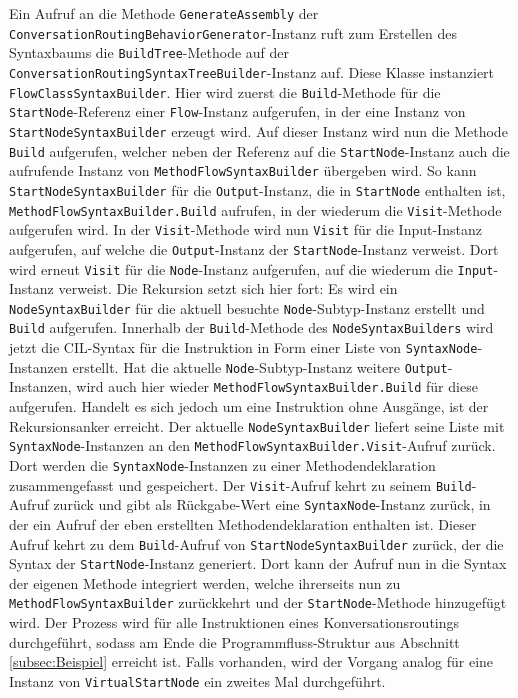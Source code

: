 \noindent Ein Aufruf an die Methode \texttt{GenerateAssembly} der \texttt{Con\-ver\-sa\-tion\-Rou\-ting\-Be\-ha\-vior\-Gen\-era\-tor}-Instanz ruft zum Erstellen des Syntaxbaums die \texttt{Build\-Tree}-Methode auf der \texttt{Con\-ver\-sa\-tion\-Rou\-ting\-Syn\-tax\-Tree\-Buil\-der}-Instanz auf. Diese Klasse instanziert \texttt{Flow\-Class\-Syn\-tax\-Buil\-der}. Hier wird zuerst die \texttt{Build}-Methode für die \texttt{StartNode}-Referenz einer \texttt{Flow}-Instanz aufgerufen, in der eine Instanz von \texttt{StartNodeSyntaxBuilder} erzeugt wird. Auf dieser Instanz wird nun die Methode \texttt{Build} aufgerufen, welcher neben der Referenz auf die \texttt{StartNode}-Instanz auch die aufrufende Instanz von \texttt{Meth\-od\-Flow\-Syn\-tax\-Buil\-der} übergeben wird. So kann \texttt{StartNodeSyntaxBuilder} für die \texttt{Output}-Instanz, die in \texttt{StartNode} enthalten ist, \texttt{MethodFlowSyntaxBuilder.Build} aufrufen, in der wiederum die \texttt{Visit}-Methode aufgerufen wird. In der \texttt{Visit}-Methode wird nun \texttt{Visit} für die Input-Instanz aufgerufen, auf welche die \texttt{Output}-Instanz der \texttt{Start\-Node}-Instanz verweist. Dort wird erneut \texttt{Visit} für die \texttt{Node}-Instanz aufgerufen, auf die wiederum die \texttt{Input}-Instanz verweist. Die Rekursion setzt sich hier fort: Es wird ein \texttt{NodeSyntaxBuilder} für die aktuell besuchte \texttt{Node}-Subtyp-Instanz erstellt und \texttt{Build} aufgerufen. Innerhalb der \texttt{Build}-Methode des \texttt{NodeSyntaxBuilders} wird jetzt die CIL-Syntax für die Instruktion in Form einer Liste von \texttt{SyntaxNode}-Instanzen erstellt. Hat die aktuelle \texttt{Node}-Subtyp-Instanz weitere \texttt{Output}-Instanzen, wird auch hier wieder \texttt{Meth\-od\-Flow\-Syn\-tax\-Buil\-der.Build} für diese aufgerufen. Handelt es sich jedoch um eine Instruktion ohne Ausgänge, ist der Rekursionsanker erreicht. Der aktuelle \texttt{NodeSyntaxBuilder} liefert seine Liste mit \texttt{SyntaxNode}-Instanzen an den \texttt{Meth\-od\-Flow\-Syn\-tax\-Buil\-der.Visit}-Aufruf zurück. Dort werden die \texttt{SyntaxNode}-Instanzen zu einer Methodendeklaration zusammengefasst und gespeichert. Der \texttt{Visit}-Aufruf kehrt zu seinem \texttt{Build}-Aufruf zurück und gibt als Rückgabe-Wert eine \texttt{SyntaxNode}-Instanz zurück, in der ein Aufruf der eben erstellten Methodendeklaration enthalten ist. Dieser Aufruf kehrt zu dem \texttt{Build}-Aufruf von \texttt{StartNodeSyntaxBuilder} zurück, der die Syntax der \texttt{StartNode}-Instanz generiert. Dort kann der Aufruf nun in die Syntax der eigenen Methode integriert werden, welche ihrerseits nun zu \texttt{Me\-thod\-Flow\-Syn\-tax\-Builder} zurückkehrt und der \texttt{StartNode}-Methode hinzugefügt wird. Der Prozess wird für alle Instruktionen eines Konversationsroutings durchgeführt, sodass am Ende die Programmfluss-Struktur aus Abschnitt \ref{subsec:Beispiel} erreicht ist. Falls vorhanden, wird der Vorgang analog für eine Instanz von \texttt{VirtualStartNode} ein zweites Mal durchgeführt.
